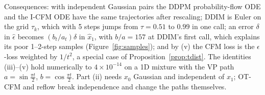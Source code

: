 Consequences: with independent Gaussian pairs the DDPM probability-flow ODE and the I-CFM ODE have the same trajectories after rescaling; DDIM is Euler on the grid $\tau_k$, which with 5 steps jumps from $\tau=0.51$ to $0.99$ in one call; an error $\delta$ in $\hat\epsilon$ becomes $(b_t/a_t)\delta$ in $\hat x_1$, with $b/a=157$ at DDIM's first call, which explains its poor 1--2-step samples (Figure~\ref{fig:samples}); and by (v) the CFM loss is the $\epsilon$-loss weighted by $1/t^2$, a special case of Proposition~\ref{prop:tdist}. The identities (iii)--(v) hold numerically to $4\times10^{-14}$ on a 1D mixture with the VP path $a=\sin\frac{\pi t}{2}$, $b=\cos\frac{\pi t}{2}$. Part (ii) needs $x_0$ Gaussian and independent of $x_1$; OT-CFM and reflow break independence and change the paths themselves.
